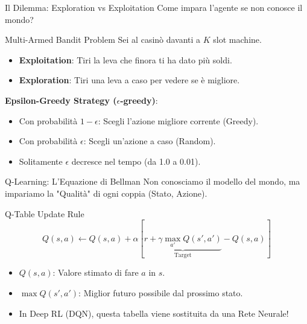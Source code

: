 \documentclass[aspectratio=169, 10pt]{beamer}
\begin{document}
\begin{frame}{Il Dilemma: Exploration vs Exploitation}
    Come impara l'agente se non conosce il mondo?
    
    \begin{block}{Multi-Armed Bandit Problem}
        Sei al casinò davanti a $K$ slot machine.
        \begin{itemize}
            \item \textbf{Exploitation}: Tiri la leva che finora ti ha dato più soldi.
            \item \textbf{Exploration}: Tiri una leva a caso per vedere se è migliore.
        \end{itemize}
    \end{block}
    
    \textbf{Epsilon-Greedy Strategy ($\epsilon$-greedy)}:
    \begin{itemize}
        \item Con probabilità $1-\epsilon$: Scegli l'azione migliore corrente (Greedy).
        \item Con probabilità $\epsilon$: Scegli un'azione a caso (Random).
        \item Solitamente $\epsilon$ decresce nel tempo (da 1.0 a 0.01).
    \end{itemize}
\end{frame}

\begin{frame}{Q-Learning: L'Equazione di Bellman}
    Non conosciamo il modello del mondo, ma impariamo la "Qualità" di ogni coppia (Stato, Azione).
    
    \begin{block}{Q-Table Update Rule}
        \[ Q(s,a) \leftarrow Q(s,a) + \alpha [ \underbrace{r + \gamma \max_{a'} Q(s', a')}_{\text{Target}} - Q(s,a) ] \]
    \end{block}
    
    \begin{itemize}
        \item $Q(s,a)$: Valore stimato di fare $a$ in $s$.
        \item $\max Q(s', a')$: Miglior futuro possibile dal prossimo stato.
        \item In Deep RL (DQN), questa tabella viene sostituita da una Rete Neurale!
    \end{itemize}
\end{frame}
\end{document}
